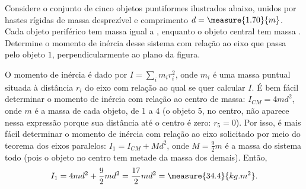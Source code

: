 \begin{question}
	Considere o conjunto de cinco objetos puntiformes ilustrados abaixo, unidos por hastes rígidas de massa desprezível e comprimento $d = \measure{1.70}{m}$.
	Cada objeto periférico tem massa igual a , enquanto o objeto central tem massa .
	Determine o momento de inércia desse sistema com relação ao eixo que passa pelo objeto $1$, perpendicularmente ao plano da figura.


	\begin{answer}
	\end{answer}

	\begin{solution}
		O momento de inércia é dado por $I = \sum_i m_i r_i^2$, onde $m_i$ é uma massa puntual situada à distância $r_i$ do eixo com relação ao qual se quer calcular $I$.
		É bem fácil determinar o momento de inércia com relação ao centro de massa: $I_{CM} = 4md^2$, onde $m$ é a massa de cada objeto, de 1 a 4 (o objeto 5, no centro, não aparece nessa expressão porque sua distância até o centro é zero: $r_5 = 0$).
		Por isso, é mais fácil determinar o momento de inércia com relação ao eixo solicitado por meio do teorema dos eixos paralelos: $I_1 = I_{CM} + Md^2$, onde $M = \frac{9}{2}m$ é a massa do sistema todo (pois o objeto no centro tem metade da massa dos demais).
		Então,
		\begin{equation*}
			I_1 = 4md^2 + \frac{9}{2}md^2 = \frac{17}{2}md^2 = \measure{34.4}{kg.m^2}.
		\end{equation*}
	\end{solution}
\end{question}